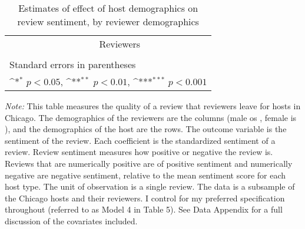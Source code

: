 \documentclass[11pt, oneside]{article}
\begin{document}
\centering
\begin{landscape}
\begin{table}[htbp]\centering
	\def\sym#1{\ifmmode^{#1}\else\(^{#1}\)\fi}
	\caption{Estimates of effect of host demographics on review sentiment, by reviewer demographics}
	\begin{tabular}{l *{8}{c}}
		\hline\hline
		&\multicolumn{8}{c}{Reviewers} \\
		\cmidrule(r){2-9}\\
			
		\hline\hline
		\multicolumn{9}{l}{\footnotesize Standard errors in parentheses}\\
		\multicolumn{9}{l}{\footnotesize \sym{*} \(p<0.05\), \sym{**} \(p<0.01\), \sym{***} \(p<0.001\)}\\
	\end{tabular}
	\begin{tablenotes}
	
	\item {\it Note:} This table measures the quality of a review that reviewers leave for hosts in Chicago. The demographics of the reviewers are the columns (male os , female is ), and the demographics of the host are the rows. The outcome variable is the sentiment of the review. Each coefficient is the standardized sentiment of a review. Review sentiment measures how positive or negative the review is. Reviews that are numerically positive are of positive sentiment and numerically negative are negative sentiment, relative to the mean sentiment score for each host type. The unit of observation is a single review. The data is a subsample of the Chicago hosts and their reviewers. I control for my preferred specification throughout (referred to as Model 4 in Table 5). See Data Appendix for a full discussion of the covariates included. 
	
	\end{tablenotes}
	
\end{table}
\end{landscape}
\end{document}
